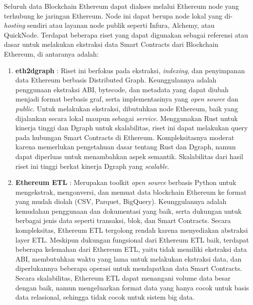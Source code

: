 Seluruh data Blockchain Ethereum dapat diakses melalui Ethereum node yang terhubung ke jaringan Ethereum. Node ini dapat berupa node lokal yang di-\textit{hosting} sendiri atau layanan node publik seperti Infura, Alchemy, atau QuickNode. Terdapat beberapa riset yang dapat digunakan sebagai referensi atau dasar untuk melakukan ekstraksi data Smart Contracts dari Blockchain Ethereum, di antaranya adalah:

\begin{enumerate}
    \item \textbf{eth2dgraph} \parencite{aimar2023extraction}: Riset ini berfokus pada ekstraksi, \textit{indexing}, dan penyimpanan data Ethereum berbasis Distributed Graph. Keunggulannya adalah penggunaan ekstraksi ABI, bytecode, dan metadata yang dapat diubah menjadi format berbasis graf, serta implementasinya yang \textit{open source} dan \textit{public}. Untuk melakukan ekstraksi, dibutuhkan node Ethereum, baik yang dijalankan secara lokal maupun sebagai \textit{service}. Menggunakan Rust untuk kinerja tinggi dan Dgraph untuk skalabilitas, riset ini dapat melakukan query pada hubungan Smart Contracts di Ethereum. Kompleksitasnya moderat karena memerlukan pengetahuan dasar tentang Rust dan Dgraph, namun dapat diperluas untuk menambahkan aspek semantik. Skalabilitas dari hasil riset ini tinggi berkat kinerja Dgraph yang \textit{scalable}.
    
    \item \textbf{Ethereum ETL} \parencite{ethereum_etl}: Merupakan toolkit \textit{open source} berbasis Python untuk mengekstrak, mengonversi, dan memuat data blockchain Ethereum ke format yang mudah diolah (CSV, Parquet, BigQuery). Keunggulannya adalah kemudahan penggunaan dan dokumentasi yang baik, serta dukungan untuk berbagai jenis data seperti transaksi, blok, dan Smart Contracts. Secara kompleksitas, Ethereum ETL tergolong rendah karena menyediakan abstraksi layer ETL. Meskipun dukungan fungsional dari Ethereum ETL baik, terdapat beberapa kelemahan dari Ethereum ETL, yaitu tidak memiliki ekstraksi data ABI, membutuhkan waktu yang lama untuk melakukan ekstraksi data, dan diperlukannya beberapa operasi untuk mendapatkan data Smart Contracts. Secara skalabilitas, Ethereum ETL dapat menangani volume data besar dengan baik, namun mengeluarkan format data yang hanya cocok untuk basis data relasional, sehingga tidak cocok untuk sistem big data. 
    

\end{enumerate}
